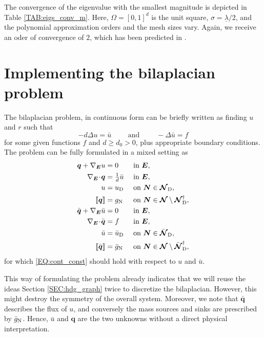 \documentclass[a4paper, english, 12pt, reqno, draft]{amsart}
\theoremstyle{definition}
\theoremstyle{remark}
\numberwithin{equation}{section}
\newcommand{\SetNode}{\ensuremath{\boldsymbol{\mathcal N}}}
\newcommand{\SetNodeDir}{\ensuremath{\SetNode_\textup D}}
\newcommand{\SetNodeBar}{\ensuremath{\bar{\boldsymbol{\mathcal N}}}}
\newcommand{\SetNodeDirBar}{\ensuremath{\SetNodeBar_\textup D}}
\newcommand{\Edge}{{\ensuremath{\boldsymbol E}}}
\newcommand{\Node}{{\ensuremath{\boldsymbol N}}}
\newcommand{\Nabla}{\ensuremath{\nabla_\Edge}}
\newcommand{\Div}{\ensuremath{\Nabla\!\cdot\!}}
\newcommand{\jump}[1]{{[\![ #1 ]\!]}}
\renewcommand{\vec}[1]{\ensuremath{\boldsymbol{#1}}}
\newcommand{\eigenval}{\ensuremath{\underline \lambda}}
\begin{document}
% 
The convergence of the eigenvalue with the smallest magnitude is depicted in Table \ref{TAB:eigs_conv_m}. Here, $\Omega = [0,1]^d$ is the unit square, $\sigma = \eigenval / 2$, and the polynomial approximation orders and the mesh sizes vary. Again, we receive an oder of convergence of $2$, which has been predicted in \cite{GopalakrishnanLNP2014}.
% 
\section{Implementing the bilaplacian problem}
% 
The bilaplacian problem, in continuous form can be briefly written as finding $u$ and $r$ such that
% 
\begin{equation*}
 -d \Delta u = \bar u \qquad \text{ and } \qquad -\Delta \bar u = f
\end{equation*}
% 
for some given functions $f$ and $d \ge d_0 > 0$, plus appropriate boundary conditions. The problem can be fully formulated in a mixed setting as
% 
\begin{subequations}\label{EQ:bilap}
\begin{align}
 \vec q + \Nabla u & = 0 && \text{ in } \Edge,\\
 \Div \vec q & = \tfrac{1}{d} \bar u && \text{ in } \Edge,\\
 u & = u_\textup D && \text{ on } \Node \in \SetNodeDir,\\
 \jump{\vec q} & = g_\textup N && \text{ on } \Node \in \SetNode \setminus \SetNodeDir^\dagger,\\
 \bar{\vec q} + \Nabla \bar u & = 0 && \text{ in } \Edge,\\
 \Div \bar{\vec q} & = f && \text{ in } \Edge,\label{EQ:bilap_f}\\
 \bar u & = \bar u_\textup D && \text{ on } \Node \in \SetNodeDirBar,\\
 \jump{\bar{\vec q}} & = \bar g_\textup N && \text{ on } \Node \in \SetNode \setminus \SetNodeDirBar^\dagger,
\end{align}
\end{subequations}
% 
for which \eqref{EQ:cont_const} should hold with respect to $u$ and $\bar u$.

This way of formulating the problem already indicates that we will reuse the ideas Section \ref{SEC:hdg_graph} twice to discretize the bilaplacian. However, this might destroy the symmetry of the overall system. Moreover, we note that $\bar{\vec q}$ describes the flux of $u$, and conversely the mass sources and sinks are prescribed by $\bar g_\textup N$. Hence, $\bar u$ and $\vec q$ are the two unknowns without a direct physical interpretation. 
\end{document}
